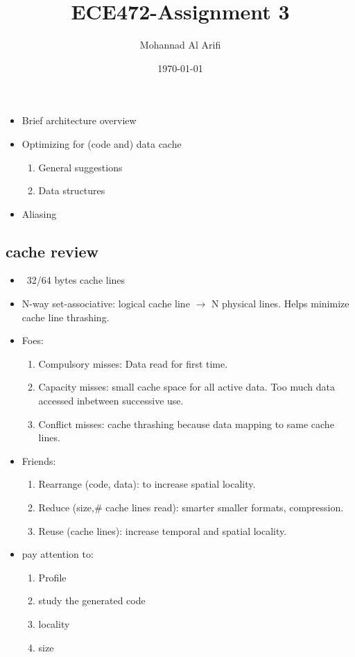 \documentclass[a4paper]{article}
\title{ECE472-Assignment 3}
\author{Mohannad Al Arifi}
\date{\today}
\begin{document}
\maketitle

\begin{itemize}
   \item Brief architecture overview
   \item Optimizing for (code and) data cache
   \begin{enumerate}
      \item General suggestions
      \item Data structures
   \end{enumerate}
   \item Aliasing
\end{itemize}

\subsection{cache review}
\begin{itemize}
   \item ~32/64 bytes cache lines 
   \item N-way set-associative: logical cache line $\rightarrow$ N physical lines. Helps minimize cache line thrashing.
   \item Foes:
   \begin{enumerate}
      \item Compulsory misses: Data read for first time.
      \item Capacity misses: small cache space for all active data. Too much data accessed inbetween successive use.
      \item Conflict misses: cache thrashing because data mapping to same cache lines.
   \end{enumerate}
   \item Friends:
   \begin{enumerate}
      \item Rearrange (code, data): to increase spatial locality.
      \item Reduce (size,\# cache lines read): smarter smaller formats, compression.
      \item Reuse (cache lines): increase temporal and spatial locality.
   \end{enumerate}
   \item pay attention to:
   \begin{enumerate}
      \item Profile
      \item study the generated code
      \item locality
      \item size
   \end{enumerate}

\end{itemize}
\end{document}
